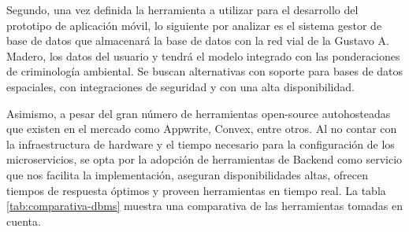 Segundo, una vez definida la herramienta a utilizar para el desarrollo del prototipo de aplicación móvil, lo siguiente por analizar es el sistema gestor de base de datos que almacenará la base de datos con la red vial de la Gustavo A. Madero, los datos del usuario y tendrá el modelo integrado con las ponderaciones de criminología ambiental. Se buscan alternativas con soporte para bases de datos espaciales, con integraciones de seguridad y con una alta disponibilidad.

Asimismo, a pesar del gran número de herramientas open-source autohosteadas que existen en el mercado como Appwrite, Convex, entre otros. Al no contar con la infraestructura de hardware y el tiempo necesario para la configuración de los microservicios, se opta por la adopción de herramientas de Backend como servicio que nos facilita la implementación, aseguran disponibilidades altas, ofrecen tiempos de respuesta óptimos y proveen herramientas en tiempo real. La tabla \ref{tab:comparativa-dbms} muestra una comparativa de las herramientas tomadas en cuenta.

